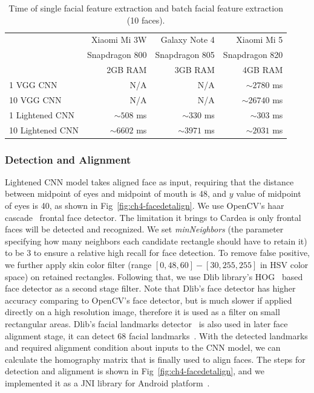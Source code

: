 \begin{table}[tb]
\centering
\caption{Time of single facial feature extraction and batch facial feature extraction (10 faces).}
\label{tbl-forwardingtime}
\begin{tabular}{lrrr}
\toprule
 & Xiaomi Mi 3W & Galaxy Note 4 & Xiaomi Mi 5\\
 & {\small Snapdragon 800} & {\small Snapdragon 805} & {\small Snapdragon 820}\\
 & {\small 2GB RAM} & {\small 3GB RAM} & {\small 4GB RAM}\\
 \midrule
1 VGG CNN & N/A & N/A & $\sim 2780$ ms \\
10 VGG CNN & N/A & N/A & $\sim 26740$ ms \\
1 Lightened CNN & $\sim 508$ ms & $\sim 330$ ms & $\sim 303$ ms \\
10 Lightened CNN & $\sim 6602$ ms & $\sim 3971$ ms & $\sim 2031$ ms \\
 \bottomrule

\end{tabular}
\end{table}


\subsubsection{Detection and Alignment}
Lightened CNN model takes aligned face as input, requiring that the distance between midpoint of eyes and midpoint of mouth is 48, and $y$ value of midpoint of eyes is 40, as shown in Fig~\ref{fig:ch4-facedetalign}. We use OpenCV's haar cascade~\cite{links:opencv,viola2001rapid} frontal face detector. The limitation it brings to Cardea is only frontal faces will be detected and recognized. We set \emph{minNeighbors} (the parameter specifying how many neighbors each candidate rectangle should have to retain it) to be 3 to ensure a relative high recall for face detection. To remove false positive, we further apply skin color filter (range $[0, 48, 60] - [30, 255, 255]$ in HSV color space) on retained rectangles. Following that, we use Dlib library's HOG~\cite{links:dlib,dalal2005histograms} based face detector as a second stage filter. Note that Dlib's face detector has higher accuracy comparing to OpenCV's face detector, but is much slower if applied directly on a high resolution image, therefore it is used as a filter on small rectangular areas. Dlib's facial landmarks detector~\cite{links:dlibfacepose} is also used in later face alignment stage, it can detect 68 facial landmarks~\cite{links:dlibfacelandmarkspos, links:dlibfacelandmarkscoords}. With the detected landmarks and required alignment condition about inputs to the CNN model, we can calculate the homography matrix that is finally used to align faces. The steps for detection and alignment is shown in Fig~\ref{fig:ch4-facedetalign}, and we implemented it as a JNI library for Android platform~\cite{links:facealignjni}.

